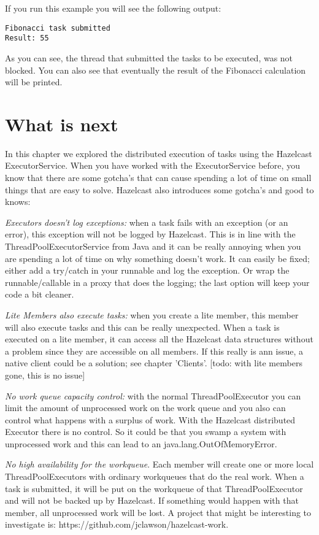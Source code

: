 If you run this example you will see the following output:
\begin{lstlisting}
Fibonacci task submitted
Result: 55
\end{lstlisting}
As you can see, the thread that submitted the tasks to be executed, was not blocked. You can also see that eventually the result of the Fibonacci calculation will be printed. 

\section{What is next}
In this chapter we explored the distributed execution of tasks using the Hazelcast ExecutorService. When you have worked with the ExecutorService before, you know that there are some gotcha's that can cause spending a lot of time on small things that are easy to solve. Hazelcast also introduces some gotcha's and good to knows:

\emph{Executors doesn't log exceptions:} when a task fails with an exception (or an error), this exception will not be logged by Hazelcast. This is in line with the ThreadPoolExecutorService from Java and it can be really annoying when you are spending a lot of time on why something doesn't work. It can easily be fixed; either add a try/catch in your runnable and log the exception. Or wrap the runnable/callable in a proxy that does the logging; the last option will keep your code a bit cleaner. 

\emph{Lite Members also execute tasks:} when you create a lite member, this member will also execute tasks and this can be really unexpected. When a task is executed on a lite member, it can access all the Hazelcast data structures without a problem since they are accessible on all members. If this really is ann issue, a native client could be a solution; see chapter 'Clients'. [todo: with lite members gone, this is no issue]

\emph{No work queue capacity control:} with the normal ThreadPoolExecutor you can limit the amount of unprocessed work on the work queue and you also can control what happens with a surplus of work. With the Hazelcast distributed Executor there is no control. So it could be that you swamp a system with unprocessed work and this can lead to an java.lang.OutOfMemoryError.

\emph{No high availability for the workqueue}. Each member will create one or more local ThreadPoolExecutors with ordinary workqueues that do the real work. When a task is submitted, it will be put on the workqueue of that ThreadPoolExecutor and will not be backed up by Hazelcast. If something would happen with that member, all unprocessed work will be lost. A project that might be interesting to investigate is: https://github.com/jclawson/hazelcast-work.

